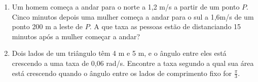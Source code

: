 \documentclass[a4paper,5pt]{amsbook}
\newcommand{\ds}{\displaystyle}
\begin{document}
\begin{enumerate}
    \vspace{0.5cm}
    \item Um homem come\c{c}a a andar para o norte a 1,2 m/s a partir de um ponto
        $P$. Cinco minutos depois uma mulher come\c{c}a a andar para o sul a
        1,6m/s de um ponto 200 m a leste de $P$. A que taxa as pessoas est\~ao
        de distanciando 15 minutos ap\'os a mulher come\c{c}ar a andar?

    \vspace{0.5cm}
    \item Dois lados de um tri\^angulo t\^em 4 m e 5 m, e o \^angulo entre eles
        est\'a crescendo a uma taxa de 0,06 rad/s. Encontre a taxa segundo a
        qual sua \'area est\'a crescendo quando o \^angulo entre os lados de
        comprimento fixo for $\ds\frac{\pi}{3}$.
\end{enumerate}
\end{document}
